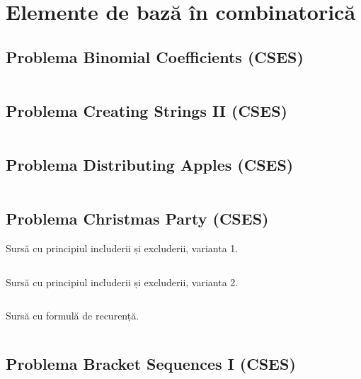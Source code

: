 \documentclass[../main.tex]{subfiles}
\begin{document}
\chapter{Elemente de bază în combinatorică}

\section{Problema Binomial Coefficients (CSES)}
\label{code:binomial-coefficients}

\inputminted{cpp}{../src/math/binomial-coefficients.cpp}

\section{Problema Creating Strings II (CSES)}
\label{code:creating-strings-2}

\inputminted{cpp}{../src/math/creating-strings-2.cpp}

\section{Problema Distributing Apples (CSES)}
\label{code:distributing-apples}

\inputminted{cpp}{../src/math/distributing-apples.cpp}

\section{Problema Christmas Party (CSES)}
\label{code:christmas-party}

Sursă cu principiul includerii și excluderii, varianta 1.

\inputminted{cpp}{../src/math/christmas-party-pie-1.cpp}

Sursă cu principiul includerii și excluderii, varianta 2.

\inputminted{cpp}{../src/math/christmas-party-pie-2.cpp}

Sursă cu formulă de recurență.

\inputminted{cpp}{../src/math/christmas-party-rec.cpp}

\section{Problema Bracket Sequences I (CSES)}
\label{code:bracket-sequences-1}
\end{document}
